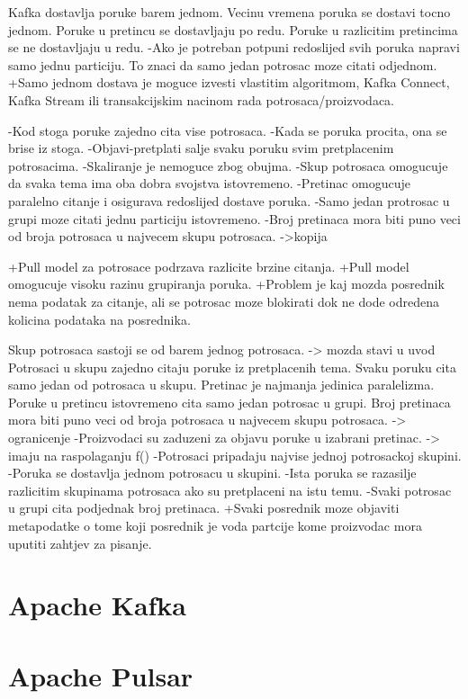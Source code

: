 \documentclass[times, utf8, diplomski, numeric]{fer}
\begin{document}
Kafka dostavlja poruke barem jednom.
Vecinu vremena poruka se dostavi tocno jednom.
Poruke u pretincu se dostavljaju po redu.
Poruke u razlicitim pretincima se ne dostavljaju u redu.
-Ako je potreban potpuni redoslijed svih poruka napravi samo jednu particiju. To znaci da samo jedan potrosac moze citati odjednom.
+Samo jednom dostava je moguce izvesti vlastitim algoritmom, Kafka Connect, Kafka Stream ili transakcijskim nacinom rada potrosaca/proizvodaca.

-Kod stoga poruke zajedno cita vise potrosaca.
-Kada se poruka procita, ona se brise iz stoga.
-Objavi-pretplati salje svaku poruku svim pretplacenim potrosacima.
-Skaliranje je nemoguce zbog obujma.
-Skup potrosaca omogucuje da svaka tema ima oba dobra svojstva istovremeno.
-Pretinac omogucuje paralelno citanje i osigurava redoslijed dostave poruka.
-Samo jedan protrosac u grupi moze citati jednu particiju istovremeno.
-Broj pretinaca mora biti puno veci od broja potrosaca u najvecem skupu potrosaca. ->kopija

+Pull model za potrosace podrzava razlicite brzine citanja.
+Pull model omogucuje visoku razinu grupiranja poruka.
+Problem je kaj mozda posrednik nema podatak za citanje, ali se potrosac moze blokirati dok ne dode odredena kolicina podataka na posrednika.

Skup potrosaca sastoji se od barem jednog potrosaca. -> mozda stavi u uvod
Potrosaci u skupu zajedno citaju poruke iz pretplacenih tema.
Svaku poruku cita samo jedan od potrosaca u skupu.
Pretinac je najmanja jedinica paralelizma.
Poruke u pretincu istovremeno cita samo jedan potrosac u grupi.
Broj pretinaca mora biti puno veci od broja potrosaca u najvecem skupu potrosaca. -> ogranicenje
-Proizvodaci su zaduzeni za objavu poruke u izabrani pretinac. -> imaju na raspolaganju f()
-Potrosaci pripadaju najvise jednoj potrosackoj skupini.
-Poruka se dostavlja jednom potrosacu u skupini.
-Ista poruka se razasilje razlicitim skupinama potrosaca ako su pretplaceni na istu temu.
-Svaki potrosac u grupi cita podjednak broj pretinaca.
+Svaki posrednik moze objaviti metapodatke o tome koji posrednik je voda partcije kome proizvodac mora uputiti zahtjev za pisanje.



\section{Apache Kafka}

\section{Apache Pulsar}
\end{document}
